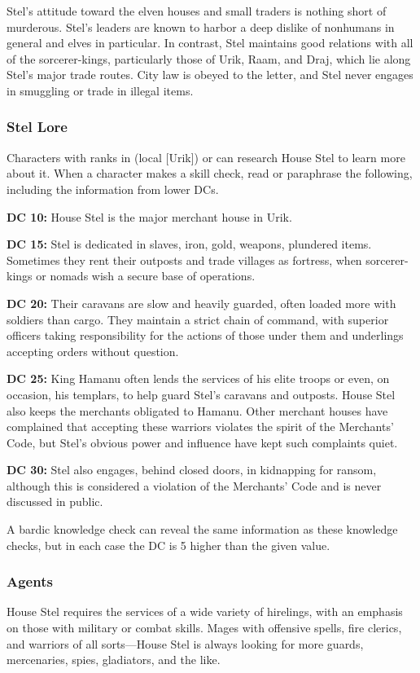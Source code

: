 Stel's attitude toward the elven houses and small traders is nothing short of murderous. Stel's leaders are known to harbor a deep dislike of nonhumans in general and elves in particular. In contrast, Stel maintains good relations with all of the sorcerer-kings, particularly those of Urik, Raam, and Draj, which lie along Stel's major trade routes. City law is obeyed to the letter, and Stel never engages in smuggling or trade in illegal items.

\subsubsection{Stel Lore}
Characters with ranks in  (local [Urik]) or  can research House Stel to learn more about it. When a character makes a skill check, read or paraphrase the following, including the information from lower DCs.

\textbf{DC 10:} House Stel is the major merchant house in Urik.

\textbf{DC 15:} Stel is dedicated in slaves, iron, gold, weapons, plundered items. Sometimes they rent their outposts and trade villages as fortress, when sorcerer-kings or nomads wish a secure base of operations.

\textbf{DC 20:} Their caravans are slow and heavily guarded, often loaded more with soldiers than cargo. They maintain a strict chain of command, with superior officers taking responsibility for the actions of those under them and underlings accepting orders without question.

\textbf{DC 25:} King Hamanu often lends the services of his elite troops or even, on occasion, his templars, to help guard Stel's caravans and outposts. House Stel also keeps the merchants obligated to Hamanu. Other merchant houses have complained that accepting these warriors violates the spirit of the Merchants' Code, but Stel's obvious power and influence have kept such complaints quiet.

\textbf{DC 30:} Stel also engages, behind closed doors, in kidnapping for ransom, although this is considered a violation of the Merchants' Code and is never discussed in public.

A bardic knowledge check can reveal the same information as these knowledge checks, but in each case the DC is 5 higher than the given value.

\subsubsection{Agents}
House Stel requires the services of a wide variety of hirelings, with an emphasis on those with military or combat skills. Mages with offensive spells, fire clerics, and warriors of all sorts---House Stel is always looking for more guards, mercenaries, spies, gladiators, and the like.

